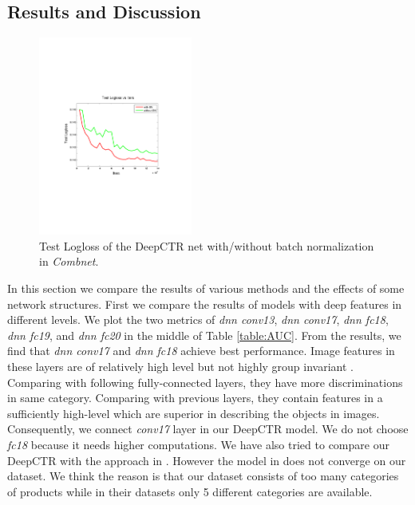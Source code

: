 \documentclass{sig-alternate-05-2015}
\begin{document}
\subsection{Results and Discussion}
\begin{figure}
	\centering
	\includegraphics[width=0.45\textwidth]{BN_test_embed}
	\caption{Test Logloss of the DeepCTR net with/without batch normalization in \emph{Combnet}. }
	\label{fig:bn}
\end{figure} 
In this section we compare the results of various methods and the effects of some network structures. First we compare the results of  models with deep features in different levels. We plot the two metrics of \emph{dnn conv13}, \emph{dnn conv17}, \emph{dnn fc18}, \emph{dnn fc19}, and \emph{dnn fc20} in the middle of Table \ref{table:AUC}. From the results, we find that \emph{dnn conv17} and \emph{dnn fc18} achieve best performance. Image features in these layers are of relatively high level but not highly group invariant \cite{zeiler2014visualizing}. Comparing with following fully-connected layers, they have more discriminations in same category. Comparing with previous layers, they contain  features in a sufficiently high-level  which are superior in describing the objects in images. Consequently, we connect \emph{conv17} layer in our DeepCTR model. We do not choose \emph{fc18} because it needs higher computations. We have also tried to compare our DeepCTR with the approach in \cite{Mo:2015:IFL:2832747.2832769}. However the model in \cite{Mo:2015:IFL:2832747.2832769} does not converge on our dataset. We think the reason is that our dataset consists of too many categories of products while in their datasets only 5 different categories are available.
\end{document}
